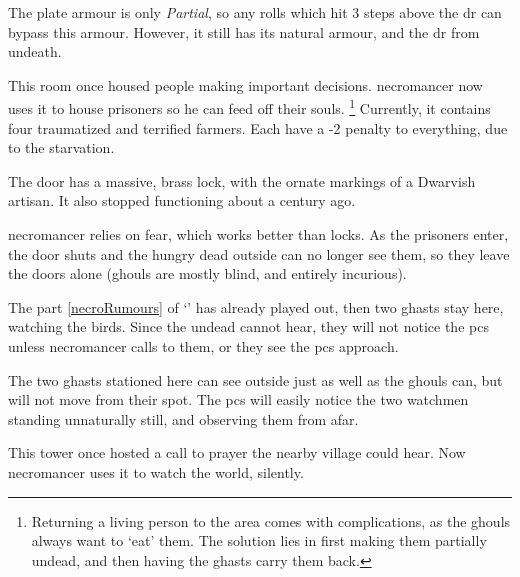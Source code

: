 The plate armour is only \textit{Partial}, so any rolls which hit 3 steps above the \gls{dr} can bypass this armour.
However, it still has its natural armour, and the \gls{dr} from undeath.%

\undeadBasilisk



This room once housed people making important decisions.
\Gls{necromancer} now uses it to house prisoners so he can feed off their souls.%
\footnote{Returning a living person to the area comes with complications, as the ghouls always want to `eat' them.
The solution lies in first making them partially undead, and then having the ghasts carry them back.}
Currently, it contains four traumatized and terrified farmers.
Each have a -2 penalty to everything, due to the starvation.

The door has a massive, brass lock, with the ornate markings of a Dwarvish artisan.
It also stopped functioning about a century ago.

\Gls{necromancer} relies on fear, which works better than locks.
As the prisoners enter, the door shuts and the hungry dead outside can no longer see them, so they leave the doors alone (ghouls are mostly blind, and entirely incurious).


The part \ref{necroRumours} of `' has already played out, then two ghasts stay here, watching the birds.
Since the undead cannot hear, they will not notice the \glspl{pc} unless \gls{necromancer} calls to them, or they see the \glspl{pc} approach.


The two ghasts stationed here can see outside just as well as the ghouls can, but will not move from their spot.
The \glspl{pc} will easily notice the two watchmen standing unnaturally still, and observing them from afar.


\begin{exampletext}
This tower once hosted a call to prayer the nearby \gls{village} could hear.
Now \gls{necromancer} uses it to watch the world, silently.
\end{exampletext}

